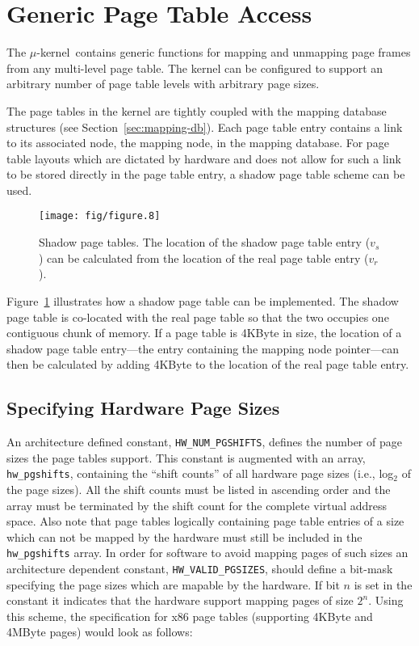 \documentclass[a4paper,twoside]{book}
\newcommand{\ukern}{$\mu$-kernel}
\newcommand{\Var}[1]{\texttt{#1}}
\begin{document}
\section{Generic Page Table Access}

The \ukern\ contains generic functions for mapping and unmapping page
frames from any multi-level page table.  The kernel can be configured
to support an arbitrary number of page table levels with arbitrary
page sizes.

The page tables in the kernel are tightly coupled with the mapping
database structures (see Section~\ref{sec:mapping-db}).  Each page
table entry contains a link to its associated node, the mapping node,
in the mapping database.  For page table layouts which are dictated by
hardware and does not allow for such a link to be stored directly in
the page table entry, a shadow page table scheme can be used.

\begin{figure}[ht]
  \begin{center}
    \texttt{[image: fig/figure.8]}
    \caption[Shadow page tables]{Shadow page tables.  The location of the
      shadow page table entry ($v_s$) can be calculated from the
      location of the real page table entry ($v_r$).}
    \label{fig:shadow-pagetab}
  \end{center}
\end{figure}

Figure~\ref{fig:shadow-pagetab} illustrates how a shadow page table
can be implemented.  The shadow page table is co-located with the real
page table so that the two occupies one contiguous chunk of memory.
If a page table is 4KByte in size, the location of a shadow page table
entry---the entry containing the mapping node pointer---can then be
calculated by adding 4KByte to the location of the real page table
entry.


\subsection{Specifying Hardware Page Sizes}

An architecture defined constant, \Var{HW\_NUM\_PGSHIFTS}, defines the
number of page sizes the page tables support.  This constant is
augmented with an array, \Var{hw\_pgshifts}, containing the ``shift
counts'' of all hardware page sizes (i.e., log$_2$ of the page sizes).
All the shift counts must be listed in ascending order and the array
must be terminated by the shift count for the complete virtual address
space.  Also note that page tables logically containing page table
entries of a size which can not be mapped by the hardware must still
be included in the \Var{hw\_pgshifts} array.  In order for software to
avoid mapping pages of such sizes an architecture dependent constant,
\Var{HW\_VALID\_PGSIZES}, should define a bit-mask specifying the page
sizes which are mapable by the hardware.  If bit $n$ is set in the
constant it indicates that the hardware support mapping pages of size
$2^n$.  Using this scheme, the specification for x86 page tables
(supporting 4KByte and 4MByte pages) would look as follows:
\end{document}

